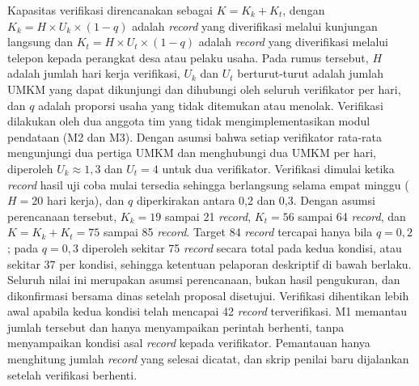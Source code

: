 Kapasitas verifikasi direncanakan sebagai $K = K_k + K_t$, dengan $K_k = H \times U_k \times (1 - q)$ adalah \textit{record} yang diverifikasi melalui kunjungan langsung dan $K_t = H \times U_t \times (1 - q)$ adalah \textit{record} yang diverifikasi melalui telepon kepada perangkat desa atau pelaku usaha. Pada rumus tersebut, $H$ adalah jumlah hari kerja verifikasi, $U_k$ dan $U_t$ berturut-turut adalah jumlah UMKM yang dapat dikunjungi dan dihubungi oleh seluruh verifikator per hari, dan $q$ adalah proporsi usaha yang tidak ditemukan atau menolak. Verifikasi dilakukan oleh dua anggota tim yang tidak mengimplementasikan modul pendataan (M2 dan M3). Dengan asumsi bahwa setiap verifikator rata-rata mengunjungi dua pertiga UMKM dan menghubungi dua UMKM per hari, diperoleh $U_k \approx 1{,}3$ dan $U_t = 4$ untuk dua verifikator. Verifikasi dimulai ketika \textit{record} hasil uji coba mulai tersedia sehingga berlangsung selama empat minggu ($H = 20$ hari kerja), dan $q$ diperkirakan antara 0,2 dan 0,3. Dengan asumsi perencanaan tersebut, $K_k = 19$ sampai 21 \textit{record}, $K_t = 56$ sampai 64 \textit{record}, dan $K = K_k + K_t = 75$ sampai 85 \textit{record}. Target 84 \textit{record} tercapai hanya bila $q = 0{,}2$; pada $q = 0{,}3$ diperoleh sekitar 75 \textit{record} secara total pada kedua kondisi, atau sekitar 37 per kondisi, sehingga ketentuan pelaporan deskriptif di bawah berlaku. Seluruh nilai ini merupakan asumsi perencanaan, bukan hasil pengukuran, dan dikonfirmasi bersama dinas setelah proposal disetujui. Verifikasi dihentikan lebih awal apabila kedua kondisi telah mencapai 42 \textit{record} terverifikasi. M1 memantau jumlah tersebut dan hanya menyampaikan perintah berhenti, tanpa menyampaikan kondisi asal \textit{record} kepada verifikator. Pemantauan hanya menghitung jumlah \textit{record} yang selesai dicatat, dan skrip penilai baru dijalankan setelah verifikasi berhenti.

